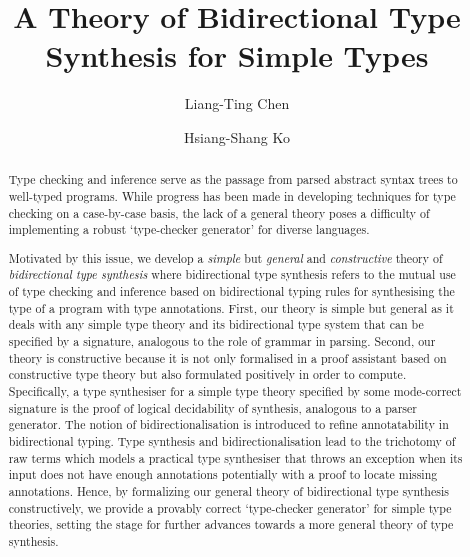 \documentclass[acmsmall,screen]{acmart}
\theoremstyle{acmdefinition}
\begin{document}
\author{Liang-Ting Chen}
\author{Hsiang-Shang Ko}


\title{A Theory of Bidirectional Type Synthesis for Simple Types}

\begin{abstract}
  Type checking and inference serve as the passage from parsed abstract syntax trees to well-typed programs.
  While progress has been made in developing techniques for type checking on a case-by-case basis, the lack of a general theory poses a difficulty of implementing a robust `type-checker generator' for diverse languages.

  Motivated by this issue, we develop a \emph{simple} but \emph{general} and \emph{constructive} theory of \emph{bidirectional type synthesis} where bidirectional type synthesis refers to the mutual use of type checking and inference based on bidirectional typing rules for synthesising the type of a program with type annotations.
  First, our theory is simple but general as it deals with any simple type theory and its bidirectional type system that can be specified by a signature, analogous to the role of grammar in parsing.
  Second, our theory is constructive because it is not only formalised in a proof assistant based on constructive type theory but also formulated positively in order to compute.
  Specifically, a type synthesiser for a simple type theory specified by some mode-correct signature is the proof of logical decidability of synthesis, analogous to a parser generator.
  The notion of bidirectionalisation is introduced to refine annotatability in bidirectional typing.
  Type synthesis and bidirectionalisation lead to the trichotomy of raw terms which models a practical type synthesiser that throws an exception when its input does not have enough annotations potentially with a proof to locate missing annotations.
  Hence, by formalizing our general theory of bidirectional type synthesis constructively, we provide a provably correct `type-checker generator' for simple type theories, setting the stage for further advances towards a more general theory of type synthesis.
\end{abstract}
\end{document}
